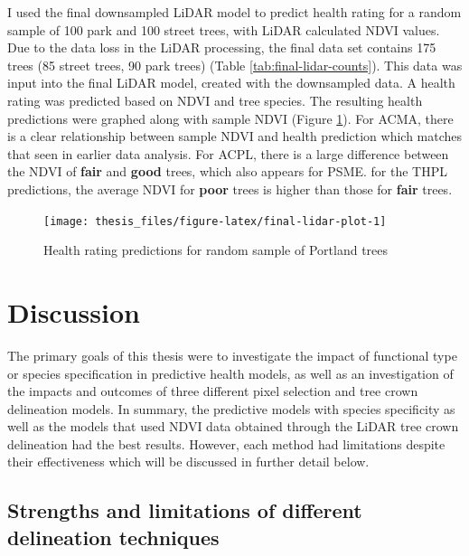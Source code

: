 \documentclass[12pt,twoside]{reedthesis}
\begin{document}
I used the
final downsampled LiDAR model to predict health rating for a random
sample of 100 park and 100 street trees, with LiDAR calculated NDVI
values. Due to the data loss in the LiDAR processing, the final data set
contains 175 trees (85 street trees, 90 park trees) (Table
\ref{tab:final-lidar-counts}). This data was input into the final LiDAR
model, created with the downsampled data. A health rating was predicted
based on NDVI and tree species. The resulting health predictions were
graphed along with sample NDVI (Figure \ref{fig:final-lidar-plot}).
For ACMA, there is a clear relationship between sample NDVI and health
prediction which matches that seen in earlier data analysis. For ACPL,
there is a large difference between the NDVI of \textbf{fair} and \textbf{good}
trees, which also appears for PSME. for the THPL predictions, the
average NDVI for \textbf{poor} trees is higher than those for \textbf{fair} trees.
\begin{figure}[H]

{\centering \texttt{[image: thesis\_files/figure-latex/final-lidar-plot-1]} 

}

\caption{Health rating predictions for random sample of Portland trees}\label{fig:final-lidar-plot}
\end{figure}
\hypertarget{discussion}{%
\chapter{Discussion}\label{discussion}}

The primary goals of this thesis were to investigate the impact of
functional type or species specification in predictive health models, as
well as an investigation of the impacts and outcomes of three different
pixel selection and tree crown delineation models. In summary, the
predictive models with species specificity as well as the models that
used NDVI data obtained through the LiDAR tree crown delineation had the
best results. However, each method had limitations despite their
effectiveness which will be discussed in further detail below.

\hypertarget{strengths-and-limitations-of-different-delineation-techniques}{%
\section{Strengths and limitations of different delineation techniques}\label{strengths-and-limitations-of-different-delineation-techniques}}
\end{document}
